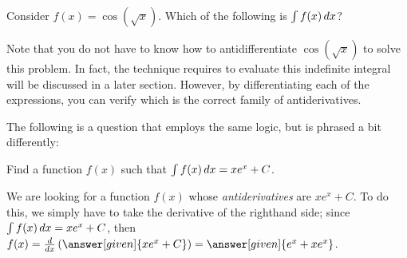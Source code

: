 \documentclass[nooutcomes]{ximera}
\begin{document}
\begin{question}
  Consider $f(x) = \cos(\sqrt{x})$. Which of the following is $\int f(x) \mathop{}\!d x$?  
  \begin{selectAll}
  \end{selectAll}
  
  \begin{feedback}
  Note that you do not have to know how to antidifferentiate
  $\cos\left(\sqrt{x}\right)$ to solve this problem.  In fact, the
  technique requires to evaluate this indefinite integral will be
  discussed in a later section. However, by differentiating each of
  the expressions, you can verify which is the correct family of
  antiderivatives.
  \end{feedback}
\end{question}

The following is a question that employs the same logic, but is phrased a bit differently:

\begin{example}
 Find a function $f(x)$ such that $\int f(x) \mathop{}\!d x = xe^x +C$.
  
  \begin{explanation}
    We are looking for a function $f(x)$ whose \emph{antiderivatives} are $xe^x +C$.  To do this, we simply have to take the derivative of the righthand side; since $\int f(x) \mathop{}\!d x =xe^x +C$, then $f(x) = \ddx\left(\answer[given]{xe^x +C}\right) =\answer[given]{e^x + xe^x}$.
    
    \end{explanation}
\end{example}



\end{document}
